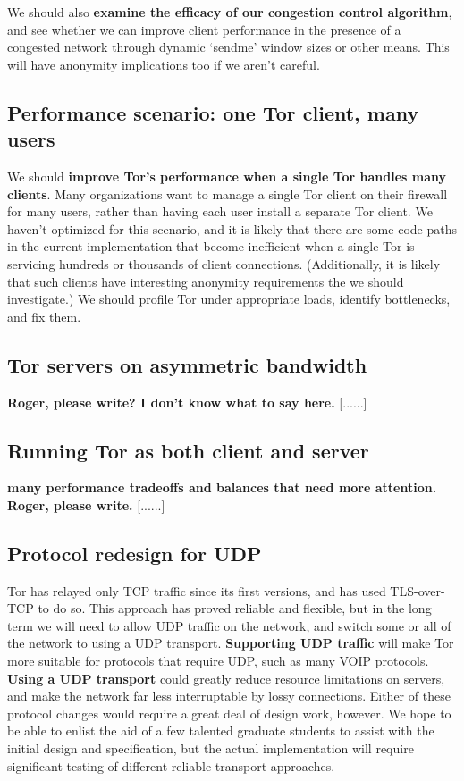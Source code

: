 \documentclass{article}
\newcommand{\tmp}[1]{{\bf #1} [......] \\}
\begin{document}
We should also {\bf examine the efficacy of our congestion control
  algorithm}, and see whether we can improve client performance in the
presence of a congested network through dynamic `sendme' window sizes or
other means.  This will have anonymity implications too if we aren't careful.

% 

\subsection{Performance scenario: one Tor client, many users}
We should {\bf improve Tor's performance when a single Tor handles many
  clients}.  Many organizations want to manage a single Tor client on their
firewall for many users, rather than having each user install a separate
Tor client.  We haven't optimized for this scenario, and it is likely that
there are some code paths in the current implementation that become
inefficient when a single Tor is servicing hundreds or thousands of client
connections.  (Additionally, it is likely that such clients have interesting
anonymity requirements the we should investigate.)  We should profile Tor
under appropriate loads, identify bottlenecks, and fix them.

%

\subsection{Tor servers on asymmetric bandwidth}

\tmp{Roger, please write? I don't know what to say here.}

\subsection{Running Tor as both client and server}

\tmp{many performance tradeoffs and balances that need more attention.
  Roger, please write.}

\subsection{Protocol redesign for UDP}
Tor has relayed only TCP traffic since its first versions, and has used
TLS-over-TCP to do so.  This approach has proved reliable and flexible, but
in the long term we will need to allow UDP traffic on the network, and switch
some or all of the network to using a UDP transport.  {\bf Supporting UDP
  traffic} will make Tor more suitable for protocols that require UDP, such
as many VOIP protocols.  {\bf Using a UDP transport} could greatly reduce
resource limitations on servers, and make the network far less interruptable
by lossy connections.  Either of these protocol changes would require a great
deal of design work, however.  We hope to be able to enlist the aid of a few
talented graduate students to assist with the initial design and
specification, but the actual implementation will require significant testing
of different reliable transport approaches.
\end{document}
